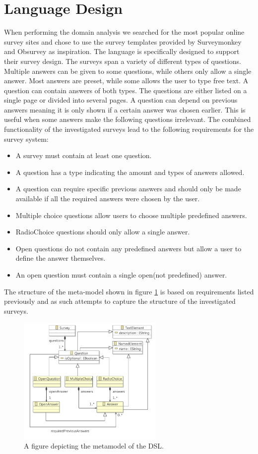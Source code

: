 \documentclass[runningheads]{llncs}
\begin{document}
\section{Language Design}
When performing the domain analysis we searched for the most popular online survey sites and chose to use the survey templates provided by Surveymonkey\cite{surveymonkey} and Obsurvey\cite{obsurvey} as inspiration. The language is specifically designed to support their survey design. The surveys span a variety of different types of questions. Multiple answers can be given to some questions, while others only allow a single answer. Most answers are preset, while some allows the user to type free text. A question can contain answers of both types. The questions are either listed on a single page or divided into several pages. A question can depend on previous answers meaning it is only shown if a certain answer was chosen earlier. This is useful when some answers make the following questions irrelevant. The combined functionality of the investigated surveys lead to the following requirements for the survey system:
\begin{itemize}
\item  A survey must contain at least one question. 
\item A question has a type indicating the amount and types of answers allowed. 
\item A question can require specific previous answers and should only be made available if all the required answers were chosen by the user. 
\item Multiple choice questions allow users to choose multiple predefined answers.
\item RadioChoice questions should only allow a single answer. 
\item Open questions do not contain any predefined answers but allow a user to define the answer themselves. 
\item An open question must contain a single open(not predefined) answer.
\end{itemize}
The structure of the meta-model shown in figure \ref{fig:mmod} is based on requirements listed previously and as such attempts to capture the structure of the investigated surveys. 
\begin{figure}
\centering
\includegraphics[height=6.2cm]{metamodel}
\caption{A figure depicting the metamodel of the DSL.}
\label{fig:mmod}
\end{figure}
\end{document}
